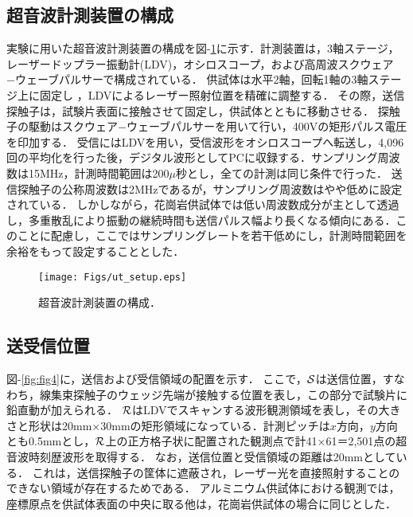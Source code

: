 \subsection{超音波計測装置の構成}
実験に用いた超音波計測装置の構成を図-\ref{fig:fig3}に示す．計測装置は，3軸ステージ，レーザードップラー振動計(LDV)，オシロスコープ，および高周波スクウェア−ウェーブパルサーで構成されている．
供試体は水平2軸，回転1軸の3軸ステージ上に固定し ，LDVによるレーザー照射位置を精確に調整する．
その際，送信探触子は，試験片表面に接触させて固定し，供試体とともに移動させる．
探触子の駆動はスクウェア−ウェーブパルサーを用いて行い，400Vの矩形パルス電圧を印加する．
受信にはLDVを用い，受信波形をオシロスコープへ転送し，4,096回の平均化を行った後，デジタル波形としてPCに収録する．サンプリング周波数は15MHz，計測時間範囲は200$\mu$秒とし，全ての計測は同じ条件で行った．
送信探触子の公称周波数は2MHzであるが，サンプリング周波数はやや低めに設定されている．
しかしながら，花崗岩供試体では低い周波数成分が主として透過し，多重散乱により振動の継続時間も送信パルス幅より長くなる傾向にある．このことに配慮し，ここではサンプリングレートを若干低めにし，計測時間範囲を余裕をもって設定することとした．
\begin{figure}[t]
\begin{center}
\texttt{[image: Figs/ut\_setup.eps]}
\caption{ 超音波計測装置の構成． }
\label{fig:fig3}
\end{center}
	\vspace{-15mm}
\end{figure}
\subsection{送受信位置}
図-\ref{fig:fig4}に，送信および受信領域の配置を示す．
ここで，${\cal S}$は送信位置，すなわち，線集束探触子のウェッジ先端が接触する位置を表し，この部分で試験片に鉛直動が加えられる．
${\cal R}$はLDVでスキャンする波形観測領域を表し，その大きさと形状は20mm$\times$30mmの矩形領域になっている．計測ピッチは$x$方向，$y$方向とも0.5mmとし，$\cal R$上の正方格子状に配置された観測点で計41×61＝2,501点の超音波時刻歴波形を取得する．
なお，送信位置と受信領域の距離は20mmとしている．
これは，送信探触子の筐体に遮蔽され，レーザー光を直接照射することのできない領域が存在するためである．
アルミニウム供試体における観測では，座標原点を供試体表面の中央に取る他は，花崗岩供試体の場合に同じとした．

